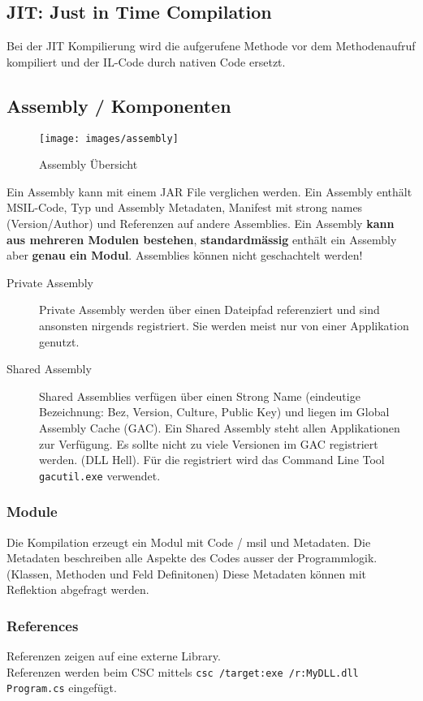 \subsection{JIT: Just in Time Compilation}
Bei der JIT Kompilierung wird die aufgerufene Methode vor dem Methodenaufruf kompiliert und der IL-Code durch nativen Code ersetzt.

\subsection{Assembly / Komponenten}
\begin{figure}[h!]
\centering
\texttt{[image: images/assembly]}
\caption{Assembly Übersicht}
\label{fig:assembly}
\end{figure}

Ein Assembly kann mit einem JAR File verglichen werden. Ein Assembly enthält MSIL-Code, Typ und Assembly Metadaten, Manifest mit strong names (Version/Author) und Referenzen auf andere Assemblies. Ein Assembly \textbf{kann aus mehreren Modulen bestehen}, \textbf{standardmässig} enthält ein Assembly aber \textbf{genau ein Modul}. Assemblies können nicht geschachtelt werden!
\begin{description}
	\item[Private Assembly] Private Assembly werden über einen Dateipfad referenziert und sind ansonsten nirgends registriert. Sie werden meist nur von einer Applikation genutzt.
	\item[Shared Assembly] Shared Assemblies verfügen über einen Strong Name (eindeutige Bezeichnung: Bez, Version, Culture, Public Key) und liegen im Global Assembly Cache (GAC). Ein Shared Assembly steht allen Applikationen zur Verfügung. Es sollte nicht zu viele Versionen im GAC registriert werden. (DLL Hell). Für die registriert wird das Command Line Tool \lstinline|gacutil.exe| verwendet.
\end{description}

\subsubsection{Module}
Die Kompilation erzeugt ein Modul mit Code / \gls{msil} und Metadaten. Die Metadaten beschreiben alle Aspekte des Codes ausser der Programmlogik. (Klassen, Methoden und Feld Definitonen) Diese Metadaten können mit Reflektion abgefragt werden.

\subsubsection{References}
Referenzen zeigen auf eine externe Library. \\
Referenzen werden beim CSC mittels \lstinline|csc /target:exe /r:MyDLL.dll Program.cs| eingefügt.



